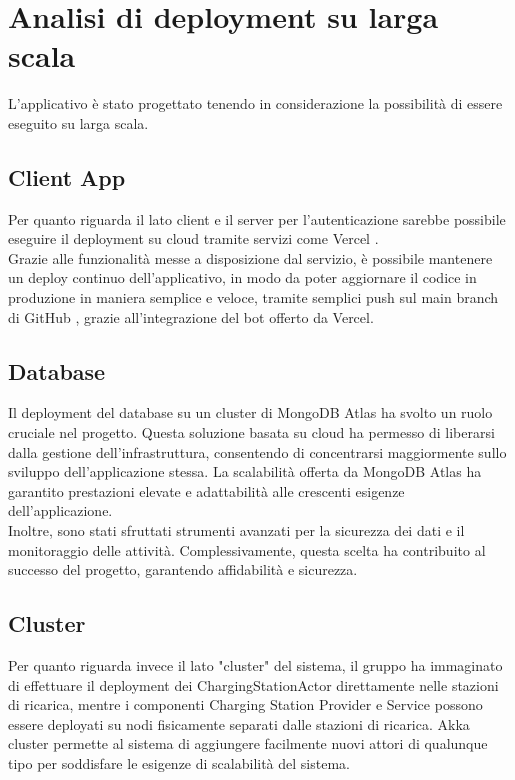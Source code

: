 

\section{Analisi di deployment su larga scala}

L'applicativo è stato progettato tenendo in considerazione la possibilità di essere eseguito su larga scala.\\

\subsection{Client App}
Per quanto riguarda il lato client e il server per l'autenticazione sarebbe possibile eseguire il
deployment su cloud tramite servizi come Vercel \cite{vercel}.\\

Grazie alle funzionalità messe a disposizione dal servizio, è possibile mantenere un deploy
continuo dell'applicativo, in modo da poter aggiornare il codice in produzione in maniera
semplice e veloce, tramite semplici push sul main branch di GitHub \cite{github}, grazie all'integrazione del bot offerto da Vercel.\\

\subsection{Database}
Il deployment del database su un cluster di MongoDB Atlas \cite{atlas} ha svolto un ruolo cruciale nel progetto.
Questa soluzione basata su cloud ha permesso di liberarsi dalla gestione dell'infrastruttura, consentendo
di concentrarsi maggiormente sullo sviluppo dell'applicazione stessa. La scalabilità offerta da MongoDB
Atlas ha garantito prestazioni elevate e adattabilità alle crescenti esigenze dell'applicazione.\\

Inoltre, sono stati sfruttati strumenti avanzati per la sicurezza dei dati e il monitoraggio delle attività.
Complessivamente, questa scelta ha contribuito al successo del progetto, garantendo affidabilità e sicurezza.\\

\subsection{Cluster}
Per quanto riguarda invece il lato "cluster" del sistema, il gruppo ha immaginato di effettuare
il deployment dei ChargingStationActor direttamente nelle stazioni di ricarica, mentre i
componenti Charging Station Provider e Service possono essere deployati su nodi fisicamente
separati dalle stazioni di ricarica. Akka cluster permette al sistema di aggiungere facilmente
nuovi attori di qualunque tipo per soddisfare le esigenze di scalabilità del sistema.\\

